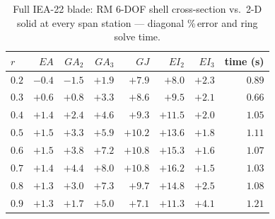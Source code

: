 \begin{table}[t]\centering\small
\caption{Full IEA-22 blade: RM 6-DOF shell cross-section vs.\ 2-D solid at every span station --- diagonal \%\,error and ring solve time.}\label{tab:fullblade}
\begin{tabular}{lrrrrrrr}
\toprule
$r$ & $EA$ & $GA_2$ & $GA_3$ & $GJ$ & $EI_2$ & $EI_3$ & time (s)\\
\midrule
$0.2$ & $-0.4$ & $-1.5$ & $+1.9$ & $+7.9$ & $+8.0$ & $+2.3$ & $0.89$\\
$0.3$ & $+0.6$ & $+0.8$ & $+3.3$ & $+8.6$ & $+9.5$ & $+2.1$ & $0.66$\\
$0.4$ & $+1.4$ & $+2.4$ & $+4.6$ & $+9.3$ & $+11.5$ & $+2.0$ & $1.05$\\
$0.5$ & $+1.5$ & $+3.3$ & $+5.9$ & $+10.2$ & $+13.6$ & $+1.8$ & $1.11$\\
$0.6$ & $+1.5$ & $+3.8$ & $+7.2$ & $+10.8$ & $+15.3$ & $+1.6$ & $1.07$\\
$0.7$ & $+1.4$ & $+4.4$ & $+8.0$ & $+10.8$ & $+16.2$ & $+1.5$ & $1.03$\\
$0.8$ & $+1.3$ & $+3.0$ & $+7.3$ & $+9.7$ & $+14.8$ & $+2.5$ & $1.08$\\
$0.9$ & $+1.3$ & $+1.7$ & $+5.0$ & $+7.1$ & $+11.3$ & $+4.1$ & $1.21$\\
\bottomrule
\end{tabular}
\end{table}